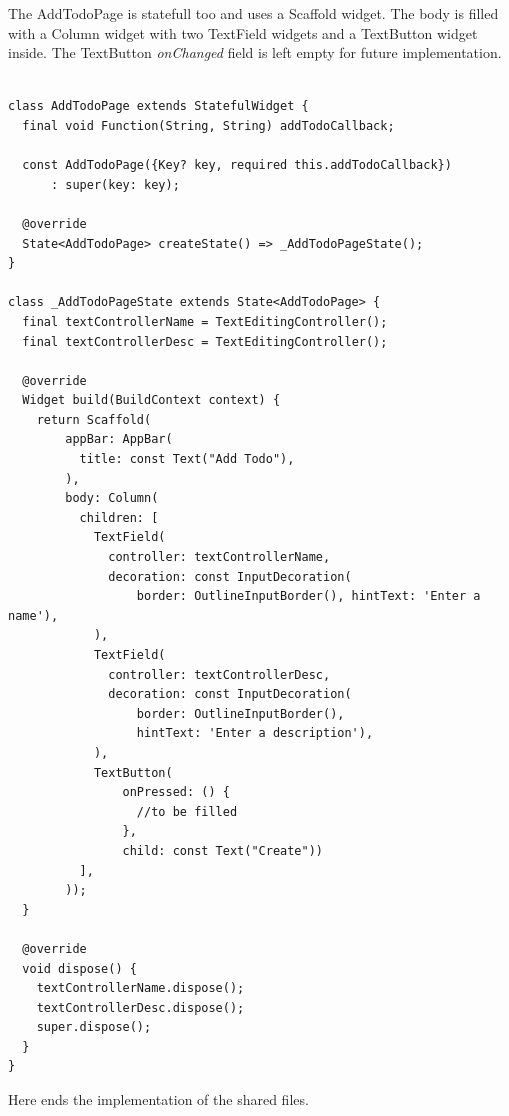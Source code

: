 The AddTodoPage is statefull too and uses a Scaffold widget. The body is filled with a Column widget with two TextField widgets and a TextButton widget inside. The TextButton \textit{onChanged }field is left empty for future implementation.
	\mbox{}
	\begin{code}
	 \mbox{}
			\label{code:2.8}
	\begin{verbatim}

class AddTodoPage extends StatefulWidget {
  final void Function(String, String) addTodoCallback;

  const AddTodoPage({Key? key, required this.addTodoCallback})
      : super(key: key);

  @override
  State<AddTodoPage> createState() => _AddTodoPageState();
}

class _AddTodoPageState extends State<AddTodoPage> {
  final textControllerName = TextEditingController();
  final textControllerDesc = TextEditingController();

  @override
  Widget build(BuildContext context) {
    return Scaffold(
        appBar: AppBar(
          title: const Text("Add Todo"),
        ),
        body: Column(
          children: [
            TextField(
              controller: textControllerName,
              decoration: const InputDecoration(
                  border: OutlineInputBorder(), hintText: 'Enter a name'),
            ),
            TextField(
              controller: textControllerDesc,
              decoration: const InputDecoration(
                  border: OutlineInputBorder(),
                  hintText: 'Enter a description'),
            ),
            TextButton(
                onPressed: () {
                  //to be filled
                },
                child: const Text("Create"))
          ],
        ));
  }

  @override
  void dispose() {
    textControllerName.dispose();
    textControllerDesc.dispose();
    super.dispose();
  }
}

	\end{verbatim}
	\end{code}
Here ends the implementation of the shared files.